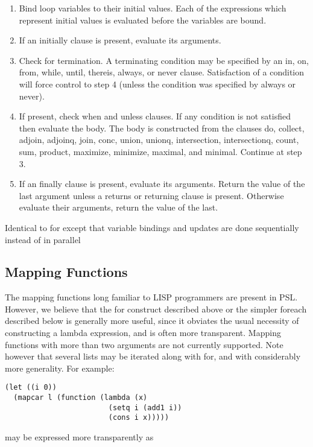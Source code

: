 \begin{enumerate}
\item  Bind loop variables to their initial values.  Each  of  the
     expressions  which  represent  initial  values is evaluated
     before the variables are bound.
\item  If an initially clause is present, evaluate its arguments.
\item  Check for termination.   A  terminating  condition  may  be
     specified  by  an  in,  on,  from,  while,  until, thereis,
     always, or never clause.  Satisfaction of a condition  will
     force control to step 4 (unless the condition was specified
     by always or never).
\item  If  present,  check  when  and  unless  clauses.    If  any
     condition is not satisfied then evaluate  the  body.    The
     body  is  constructed from the clauses do, collect, adjoin,
     adjoinq,   join,   conc,   union,   unionq,   intersection,
     intersectionq,  count,  sum,  product,  maximize, minimize,
     maximal, and minimal.  Continue at step 3.
\item  If an finally clause is present,  evaluate  its  arguments.
     Return  the  value of the last argument unless a returns or
     returning clause  is  present.   Otherwise  evaluate  their
     arguments, return the value of the last.
\end{enumerate}


{    Identical  to  for except that variable bindings and updates
    are done sequentially instead of in parallel
}
\subsection{Mapping Functions}

  The mapping  functions long  familiar  to  LISP    programmers
are  present  in  PSL.    However,    we  believe  that the  for
construct described above or the simpler foreach described below
is generally more useful, since it  obviates the usual necessity
of  constructing  a  lambda  expression,  and  is    often  more
transparent.    Mapping  functions  with more than two arguments
are not currently  supported.   Note  however    that    several
lists    may   be iterated along with for, and with considerably
more  generality.  For example:

\begin{verbatim}
(let ((i 0))
  (mapcar l (function (lambda (x)
                        (setq i (add1 i))
                        (cons i x)))))
\end{verbatim}
may be expressed more transparently as

